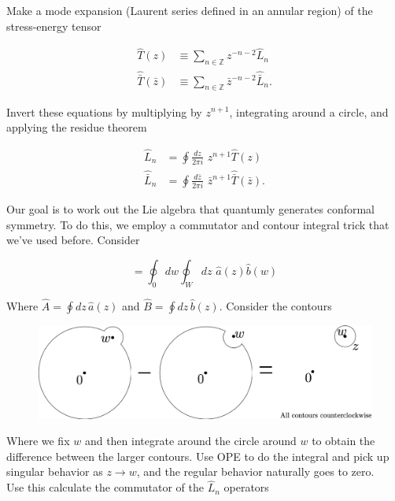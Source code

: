 \noindent Make a mode expansion (Laurent series defined in an annular region) of the stress-energy tensor

\begin{align}
\hat{T} (z) &\equiv \sum_{n \in \mathbb{Z}} z^{-n-2} \hat{L}_n \\
\hat{\bar{T}} (\bar{z}) &\equiv \sum_{n \in \mathbb{Z}} \bar{z}^{-n-2} \hat{\bar{L}}_n.
\end{align}

\noindent Invert these equations by multiplying by $z^{n+1}$, integrating around a circle, and applying the residue theorem

\begin{align}
\hat{L}_n &= \oint \frac{dz}{2\pi i} \,\, z^{n+1} \hat{T} (z) \\
\hat{\bar{L}}_n &= \oint \frac{d\bar{z}}{2\pi i} \,\, \bar{z}^{n+1} \hat{\bar{T}} (\bar{z}).
\end{align}

\noindent Our goal is to work out the Lie algebra that quantumly generates conformal symmetry. To do this, we employ a commutator and contour integral trick that we've used before. Consider

\begin{equation}
[ \hat{A}, \hat{B} ] = \oint_0 dw \oint_W dz \,\, \hat{a} (z) \hat{b} (w)
\end{equation}

\noindent Where $\hat{A} = \oint dz \, \hat{a} (z)$ and $\hat{B} = \oint dz \, \hat{b} (z)$. Consider the contours 

\begin{figure}[H]
	\centering
	\includegraphics[width=4.5in]{images/contour_trick.png}
\end{figure}

\noindent Where we fix $w$ and then integrate around the circle around $w$ to obtain the difference between the larger contours. Use OPE to do the integral and pick up singular behavior as $z \rightarrow w$, and the regular behavior naturally goes to zero. \\

\noindent Use this calculate the commutator of the $\hat{L}_n$ operators


